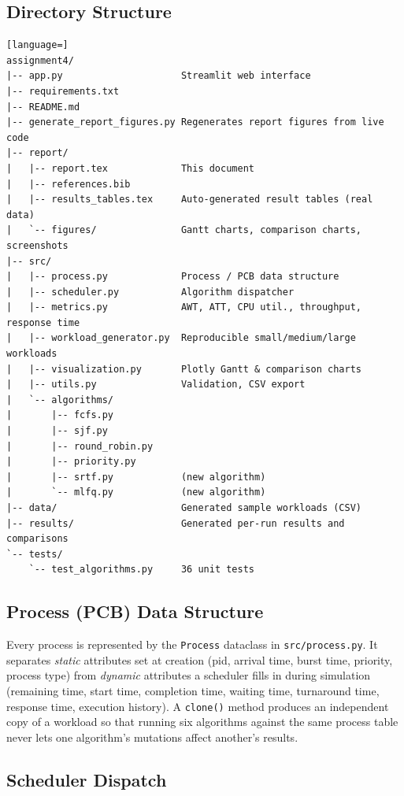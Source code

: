 \documentclass[11pt]{article}
\begin{document}
\subsection{Directory Structure}

\begin{lstlisting}[language=]
assignment4/
|-- app.py                     Streamlit web interface
|-- requirements.txt
|-- README.md
|-- generate_report_figures.py Regenerates report figures from live code
|-- report/
|   |-- report.tex             This document
|   |-- references.bib
|   |-- results_tables.tex     Auto-generated result tables (real data)
|   `-- figures/               Gantt charts, comparison charts, screenshots
|-- src/
|   |-- process.py             Process / PCB data structure
|   |-- scheduler.py           Algorithm dispatcher
|   |-- metrics.py             AWT, ATT, CPU util., throughput, response time
|   |-- workload_generator.py  Reproducible small/medium/large workloads
|   |-- visualization.py       Plotly Gantt & comparison charts
|   |-- utils.py               Validation, CSV export
|   `-- algorithms/
|       |-- fcfs.py
|       |-- sjf.py
|       |-- round_robin.py
|       |-- priority.py
|       |-- srtf.py            (new algorithm)
|       `-- mlfq.py            (new algorithm)
|-- data/                      Generated sample workloads (CSV)
|-- results/                   Generated per-run results and comparisons
`-- tests/
    `-- test_algorithms.py     36 unit tests
\end{lstlisting}

\subsection{Process (PCB) Data Structure}

Every process is represented by the \texttt{Process} dataclass in
\texttt{src/process.py}. It separates \emph{static} attributes set at
creation (pid, arrival time, burst time, priority, process type) from
\emph{dynamic} attributes a scheduler fills in during simulation
(remaining time, start time, completion time, waiting time, turnaround
time, response time, execution history). A \texttt{clone()} method
produces an independent copy of a workload so that running six algorithms
against the same process table never lets one algorithm's mutations affect
another's results.

\subsection{Scheduler Dispatch}
\end{document}

